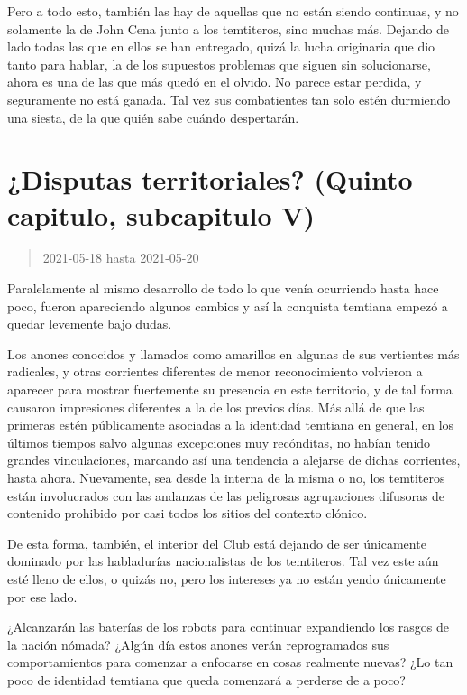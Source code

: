 \documentclass[
  spanish,
]{book}
\begin{document}
Pero a todo esto, también las hay de aquellas que no están siendo continuas, y no solamente la de John Cena junto a los temtiteros, sino muchas más. Dejando de lado todas las que en ellos se han entregado, quizá la lucha originaria que dio tanto para hablar, la de los supuestos problemas que siguen sin solucionarse, ahora es una de las que más quedó en el olvido. No parece estar perdida, y seguramente no está ganada. Tal vez sus combatientes tan solo estén durmiendo una siesta, de la que quién sabe cuándo despertarán.

\hypertarget{disputas-territoriales-quinto-capitulo-subcapitulo-v}{%
\section{¿Disputas territoriales? (Quinto capitulo, subcapitulo V)}\label{disputas-territoriales-quinto-capitulo-subcapitulo-v}}

\begin{quote}
2021-05-18 hasta 2021-05-20
\end{quote}

Paralelamente al mismo desarrollo de todo lo que venía ocurriendo hasta hace poco, fueron apareciendo algunos cambios y así la conquista temtiana empezó a quedar levemente bajo dudas.

Los anones conocidos y llamados como amarillos en algunas de sus vertientes más radicales, y otras corrientes diferentes de menor reconocimiento volvieron a aparecer para mostrar fuertemente su presencia en este territorio, y de tal forma causaron impresiones diferentes a la de los previos días. Más allá de que las primeras estén públicamente asociadas a la identidad temtiana en general, en los últimos tiempos salvo algunas excepciones muy recónditas, no habían tenido grandes vinculaciones, marcando así una tendencia a alejarse de dichas corrientes, hasta ahora. Nuevamente, sea desde la interna de la misma o no, los temtiteros están involucrados con las andanzas de las peligrosas agrupaciones difusoras de contenido prohibido por casi todos los sitios del contexto clónico.

De esta forma, también, el interior del Club está dejando de ser únicamente dominado por las habladurías nacionalistas de los temtiteros. Tal vez este aún esté lleno de ellos, o quizás no, pero los intereses ya no están yendo únicamente por ese lado.

¿Alcanzarán las baterías de los robots para continuar expandiendo los rasgos de la nación nómada? ¿Algún día estos anones verán reprogramados sus comportamientos para comenzar a enfocarse en cosas realmente nuevas? ¿Lo tan poco de identidad temtiana que queda comenzará a perderse de a poco?
\end{document}
